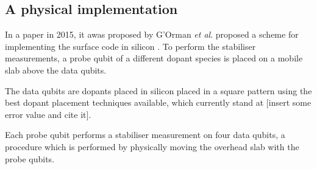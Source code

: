 \subsection{A physical implementation}
In a paper in 2015, it awas proposed by G'Orman \textit{et al}. proposed a scheme for implementing the surface code in silicon \cite{the paper}.  To perform the stabiliser measurements, a probe qubit of a different dopant species is placed on a mobile slab above the data qubits. 

The data qubits are dopants placed in silicon placed in a square pattern using the best dopant placement techniques available, which currently stand at [insert some error value and cite it].

Each probe qubit performs a stabiliser measurement on four data qubits, a procedure which is performed by physically moving the overhead slab with the probe qubits. 



\begin{figure}[H]
	\centering
	\\
	\caption[oddeven]{}
	\label{FIG:paper}
\end{figure}

